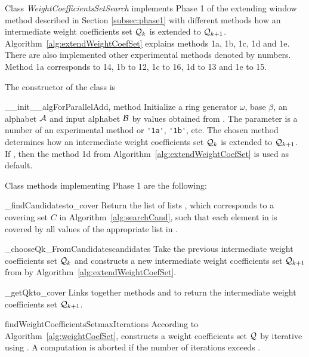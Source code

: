 Class \emph{WeightCoefficientsSetSearch} implements Phase 1 of the extending window method described in Section \ref{subsec:phase1} with different methods how an intermediate weight coefficients set $\mathcal{Q}_k$ is extended to $\mathcal{Q}_{k+1}$. Algorithm~\ref{alg:extendWeightCoefSet} explains methods 1a, 1b, 1c, 1d and 1e. There are also implemented other experimental methods denoted by numbers. Method 1a corresponds to 14, 1b to 12, 1c to 16, 1d to 13 and 1e to 15. 

The constructor of the class is 

\begin{method}{\_\_init\_\_}{algForParallelAdd, method}
Initialize a ring generator $\omega$, base $\beta$, an alphabet $\mathcal{A}$ and input alphabet $\mathcal{B}$ by values obtained from . The parameter  is a number of an experimental method or \verb+'1a'+, \verb+'1b'+, etc. The chosen method determines how an intermediate weight coefficients set $\mathcal{Q}_k$ is extended to $\mathcal{Q}_{k+1}$. If , then the method 1d from Algorithm~\ref{alg:extendWeightCoefSet} is used as default.
\end{method}

Class methods implementing Phase 1 are the following:

\begin{method}{\_findCandidates}{to\_cover}
 Return the list of lists , which corresponds to a covering set $C$ in Algorithm~\ref{alg:searchCand}, such that each element in  is covered by all values of the appropriate list in .  
\end{method}


\begin{method}{\_chooseQk\_FromCandidates}{candidates}
Take the previous intermediate weight coefficients set $\mathcal{Q}_{k}$ and constructs a new intermediate weight coefficients set $\mathcal{Q}_{k+1}$ from  by Algorithm~\ref{alg:extendWeightCoefSet}.
\end{method}


\begin{method}{\_getQk}{to\_cover}
Links together methods  and  to return the intermediate weight coefficients set $\mathcal{Q}_{k+1}$.
\end{method}

\begin{method}{findWeightCoefficientsSet}{maxIterations}
According to  Algorithm~\ref{alg:weightCoefSet}, constructs a weight coefficients set $\mathcal{Q}$ by iterative using . A computation is aborted if the number of iterations exceeds . 
\end{method}

